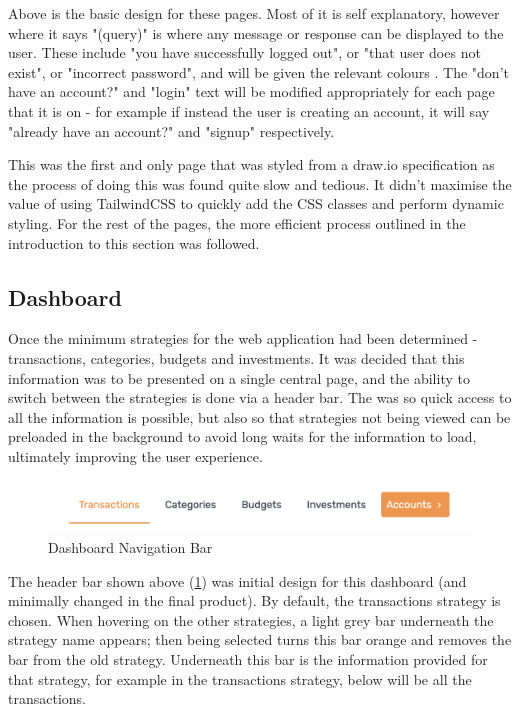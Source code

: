 Above is the basic design for these pages. Most of it is self explanatory, however where it says "(query)" is where any message or response can be displayed to the user. These include "you have successfully logged out", or "that user does not exist", or "incorrect password", and will be given the relevant colours . The "don't have an account?" and "login" text will be modified appropriately for each page that it is on - for example if instead the user is creating an account, it will say "already have an account?" and "signup" respectively.

This was the first and only page that was styled from a draw.io specification as the process of doing this was found quite slow and tedious. It didn't maximise the value of using TailwindCSS to quickly add the CSS classes and perform dynamic styling. For the rest of the pages, the more efficient process outlined in the introduction to this section was followed.

\subsection{Dashboard}
Once the minimum strategies for the web application had been determined - transactions, categories, budgets and investments. It was decided that this information was to be presented on a single central page, and the ability to switch between the strategies is done via a header bar. The was so quick access to all the information is possible, but also so that strategies not being viewed can be preloaded in the background to avoid long waits for the information to load, ultimately improving the user experience.

\begin{figure}[h!]
	\centering
	\includegraphics[width=\textwidth]{images/Header_nav_bar.png}
	\caption{Dashboard Navigation Bar}
	\label{fig:DashboardNavigationBar}
\end{figure}

The header bar shown above (\ref{fig:DashboardNavigationBar}) was initial design for this dashboard (and minimally changed in the final product). By default, the transactions strategy is chosen. When hovering on the other strategies, a light grey bar underneath the strategy name appears; then being selected turns this bar orange and removes the bar from the old strategy. Underneath this bar is the information provided for that strategy, for example in the transactions strategy, below will be all the transactions.

